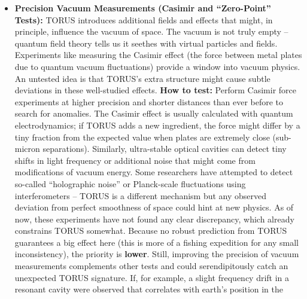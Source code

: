 \documentclass[
]{article}
\begin{document}
{\begin{itemize}
  of these tests is \textbf{medium}, mainly because they are very
  challenging -- the technology is still being refined. Even a null
  result (no deviation) is valuable: it would place limits on how much
  TORUS's recursion effects can couple into low-mass
  systems\hspace{0pt}. On the other hand, any anomaly in these precision
  tests of gravity (even a tiny one) could be a sign that something like
  TORUS is at play, bridging quantum physics and gravity in a new way.
\item
  \textbf{Precision Vacuum Measurements (Casimir and ``Zero-Point''
  Tests):} TORUS introduces additional fields and effects that might, in
  principle, influence the vacuum of space. The vacuum is not truly
  empty -- quantum field theory tells us it seethes with virtual
  particles and fields. Experiments like measuring the Casimir effect
  (the force between metal plates due to quantum vacuum fluctuations)
  provide a window into vacuum physics. An untested idea is that TORUS's
  extra structure might cause subtle deviations in these well-studied
  effects. \textbf{How to test:} Perform Casimir force experiments at
  higher precision and shorter distances than ever before to search for
  anomalies\hspace{0pt}. The Casimir effect is usually calculated with
  quantum electrodynamics; if TORUS adds a new ingredient, the force
  might differ by a tiny fraction from the expected value when plates
  are extremely close (sub-micron separations). Similarly, ultra-stable
  optical cavities can detect tiny shifts in light frequency or
  additional noise that might come from modifications of vacuum energy.
  Some researchers have attempted to detect so-called ``holographic
  noise'' or Planck-scale fluctuations using interferometers -- TORUS is
  a different mechanism but any observed deviation from perfect
  smoothness of space could hint at new physics\hspace{0pt}. As of now,
  these experiments have not found any clear discrepancy, which already
  constrains TORUS somewhat. Because no robust prediction from TORUS
  guarantees a big effect here (this is more of a fishing expedition for
  any small inconsistency), the priority is \textbf{lower}\hspace{0pt}.
  Still, improving the precision of vacuum measurements complements
  other tests and could serendipitously catch an unexpected TORUS
  signature. If, for example, a slight frequency drift in a resonant
  cavity were observed that correlates with earth's position in the

\end{itemize}}
\end{document}
